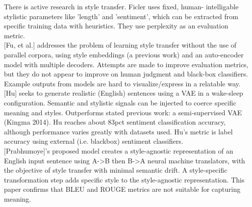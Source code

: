 \documentclass[letterpaper, 10 pt, conference]{ieeeconf}  %
\begin{document}
There is active research in style transfer. Ficler uses fixed, human- intelligable stylistic parameters like ’length’ and ’sentiment’, which can be extracted from specific training data with heuristics. They use perplexity as an evaluation metric.
\\ 

[Fu, et al.] addresses the problem of learning style transfer without the use of parallel corpora, using style embeddings (a previous work) and an auto-encoder model with multiple decoders. Attempts are made to improve evaluation metrics, but they do not appear to improve on human judgment and black-box classifiers. Example outputs from models are hard to visualize/express in a relatable way.
\\ 

[Hu] seeks to generate realistic (English) sentences using a VAE in a wake-sleep configuration. Semantic and stylistic signals can be injected to coerce specific meaning and styles.
Outperforms stated previous work: a semi-supervised VAE (Kingma 2014). Hu reaches about 83pct sentiment classification accuracy, although performance varies greatly with datasets used. Hu's metric is label accuracy using external (i.e. blackbox) sentiment classifiers.
\\ 

[Prabhumoye]'s proposed model creates a style-agnostic representation of an English input sentence using A->B then B->A neural machine translators, with the objective of style transfer with minimal semantic drift. A style-specific transformation step adds specific style to the style-agnostic representation. This paper confirms that BLEU and ROUGE metrics are not suitable for capturing meaning.
\end{document}
